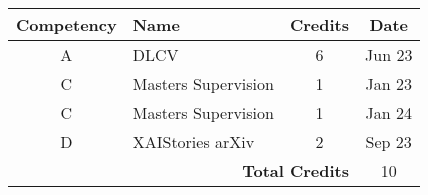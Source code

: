 \begin{tabular}{|c|l|c|c|}
    \hline
    \textbf{Competency} & \textbf{Name}             & \textbf{Credits} & \textbf{Date}   \\ \hline
    A                   & DLCV                      & 6                & Jun 23         \\ \hline
    C                   & Masters Supervision       & 1                & Jan 23        \\ \hline
    C                   & Masters Supervision       & 1                & Jan 24        \\ \hline
    D                   & XAIStories arXiv          & 2                & Sep 23        \\ \hline
    \multicolumn{3}{|r|}{\textbf{Total Credits}}   & 10               \\ \hline
\end{tabular}